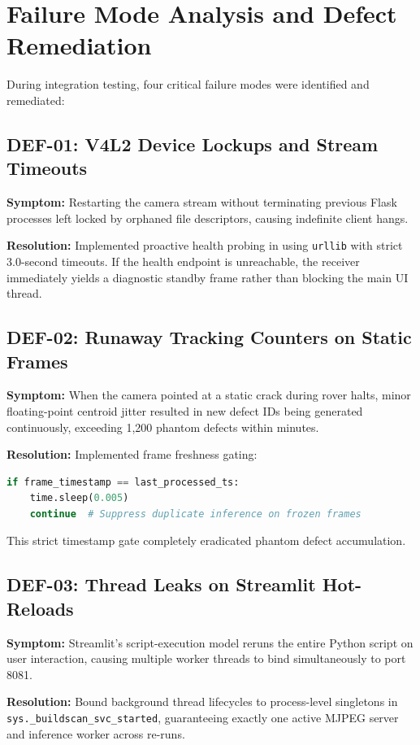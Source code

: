 \documentclass[12pt,a4paper,oneside]{report}
\begin{document}
\section{Failure Mode Analysis and Defect Remediation}
During integration testing, four critical failure modes were identified and remediated:

\subsection{DEF-01: V4L2 Device Lockups and Stream Timeouts}
\textbf{Symptom:} Restarting the camera stream without terminating previous Flask processes left  locked by orphaned file descriptors, causing indefinite client hangs.

\textbf{Resolution:} Implemented proactive health probing in  using \texttt{urllib} with strict 3.0-second timeouts. If the health endpoint is unreachable, the receiver immediately yields a diagnostic standby frame rather than blocking the main UI thread.

\subsection{DEF-02: Runaway Tracking Counters on Static Frames}
\textbf{Symptom:} When the camera pointed at a static crack during rover halts, minor floating-point centroid jitter resulted in new defect IDs being generated continuously, exceeding 1,200 phantom defects within minutes.

\textbf{Resolution:} Implemented frame freshness gating:
\begin{lstlisting}[language=Python]
if frame_timestamp == last_processed_ts:
    time.sleep(0.005)
    continue  # Suppress duplicate inference on frozen frames
\end{lstlisting}
This strict timestamp gate completely eradicated phantom defect accumulation.

\subsection{DEF-03: Thread Leaks on Streamlit Hot-Reloads}
\textbf{Symptom:} Streamlit's script-execution model reruns the entire Python script on user interaction, causing multiple worker threads to bind simultaneously to port 8081.

\textbf{Resolution:} Bound background thread lifecycles to process-level singletons in \texttt{sys.\_buildscan\_svc\_started}, guaranteeing exactly one active MJPEG server and inference worker across re-runs.
\end{document}

